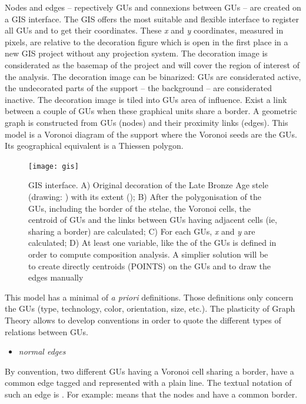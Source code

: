 \documentclass[article]{jss}\usepackage{knitr}
\begin{document}
Nodes and edges -- repectively GUs and connexions between GUs -- are created on a GIS interface. The GIS offers the most suitable and flexible interface to register all GUs and to get their coordinates. These \emph{x} and \emph{y} coordinates, measured in pixels, are relative to the decoration figure which is open in the first place in a new GIS project without any projection system. The decoration image is considerated as the basemap of the project and will cover the region of interest of the analysis. The decoration image can be binarized: GUs are considerated active, the undecorated parts of the support -- the background -- are considerated inactive. The decoration image is tiled into GUs area of influence.
Exist a link between a couple of GUs when these graphical units share a border. A geometric graph is constructed from GUs (nodes) and their proximity links (edges). This model is a Voronoi diagram of the support where the Voronoi seeds are the GUs. Its geographical equivalent is a Thiessen polygon.


\begin{figure}[H]
\centering
\texttt{[image: gis]}
\caption{\label{fig:gis} GIS interface. A) Original decoration of the Late Bronze Age  stele (drawing: \cite{DiazGuardamino10}) with its extent (); B) After the polygonisation of the GUs, including the border of the stelae, the Voronoi cells, the centroid of GUs and the links between GUs having adjacent cells (ie, sharing a border) are calculated; C) For each GUs, \emph{x} and \emph{y} are calculated; D) At least one variable, like the  of the GUs is defined in order to compute composition analysis. A simplier solution will be to create directly centroids (POINTS) on the GUs and to draw the edges manually}
\end{figure}

This model has a minimal of \emph{a priori} definitions. Those definitions only concern the GUs (type, technology, color, orientation, size, etc.). The plasticity of Graph Theory allows to develop conventions in order to quote the different types of relations between GUs.

\begin{itemize}
  \item \emph{normal edges}
\end{itemize}

By convention, two different GUs having a Voronoi cell sharing a border, have a common edge tagged  and represented with a plain line. The textual notation of such an edge is . For example:  means that the nodes  and  have a common border.
\end{document}
